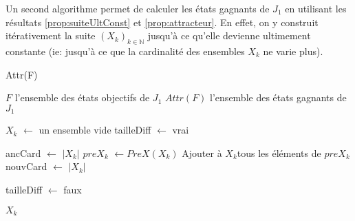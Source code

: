 Un second algorithme permet de calculer les états gagnants de $J_{1}$ en utilisant les résultats \ref{prop:suiteUltConst} et \ref{prop:attracteur}. En effet, on y construit itérativement la suite $(X_{k})_{k \in \mathbb{N}}$ jusqu'à ce qu'elle devienne ultimement constante (ie: jusqu'à ce que la cardinalité des ensembles $X_{k}$ ne varie plus).

\begin{algorithm}
	\caption{Attr(F)}
	\begin{algorithmic}
		\REQUIRE $F$ l'ensemble des états objectifs de $J_{1}$
		\ENSURE $Attr(F)$ l'ensemble des états gagnants de $J_{1}$
		
		\STATE $X_{k}$ $\leftarrow$ un ensemble vide
		\STATE tailleDiff $\leftarrow$ vrai
		
			\STATE ancCard $\leftarrow$ $|X_{k}|$
			\STATE $preX_{k}$ $\leftarrow PreX(X_{k})$
			\STATE Ajouter à $X_{k}$tous les éléments de $preX_{k}$
			\STATE nouvCard $\leftarrow$ $|X_{k}|$
			
				\STATE tailleDiff $\leftarrow$ faux
			\ENDIF
		\ENDWHILE
		
		\RETURN $X_{k}$
\end{algorithmic}
\end{algorithm}

\clearpage


